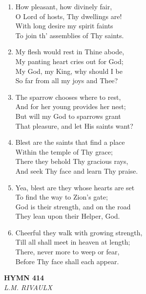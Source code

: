 \begin{enumerate}
    \item How pleasant, how divinely fair, \\
        O Lord of hosts, Thy dwellings are! \\
        With long desire my spirit faints \\
        To join th' assemblies of Thy saints.

    \item My flesh would rest in Thine abode, \\
        My panting heart cries out for God; \\
        My God, my King, why should I be \\
        So far from all my joys and Thee?

    \item The sparrow chooses where to rest, \\
        And for her young provides her nest; \\
        But will my God to sparrows grant \\
        That pleasure, and let His saints want?

    \item Blest are the saints that find a place \\
        Within the temple of Thy grace; \\
        There they behold Thy gracious rays, \\
        And seek Thy face and learn Thy praise.

    \item Yea, blest are they whose hearts are set \\
        To find the way to Zion's gate; \\
        God is their strength, and on the road \\
        They lean upon their Helper, God.

    \item Cheerful they walk with growing strength, \\
        Till all shall meet in heaven at length; \\
        There, never more to weep or fear, \\
        Before Thy face shall each appear.

\end{enumerate}

\newpage
\begin{center}
    {\Large \textbf{HYMN 414}}
    \\
    \textit{L.M. RIVAULX}
\end{center}
\vspace{1em}

